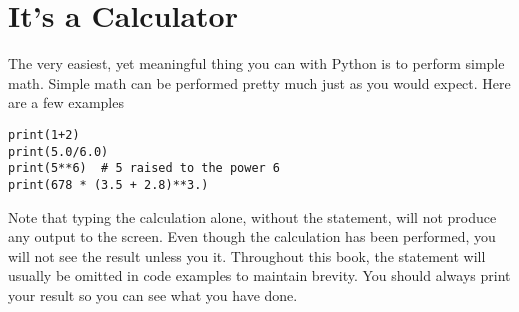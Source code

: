 \section{It's a Calculator}
The very easiest, yet meaningful thing you can with Python is to
perform simple math. Simple math can be performed pretty much just as
you would expect. Here are a few examples
\begin{Verbatim}
print(1+2)
print(5.0/6.0)
print(5**6)  # 5 raised to the power 6
print(678 * (3.5 + 2.8)**3.)
\end{Verbatim}
Note that typing the calculation alone, without the 
statement, will not produce any output to the screen.  Even though the
calculation has been performed, you will not see the result unless you
 it. Throughout this book, the 
statement will usually be omitted in code examples to maintain
brevity.  You should always print your result so you can see what you
have done.
